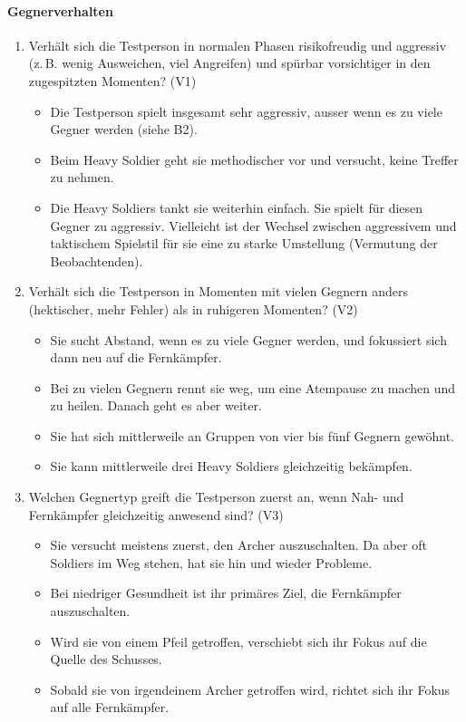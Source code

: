 \documentclass[../Main.tex]{subfiles}
\begin{document}
\paragraph{Gegnerverhalten}
\begin{enumerate}[label=\textbf{B\arabic*}, leftmargin=1.5cm, itemsep=0.8em]
    \item Verhält sich die Testperson in normalen Phasen risikofreudig und aggressiv (z.\,B. wenig Ausweichen, viel Angreifen) und spürbar vorsichtiger in den zugespitzten Momenten? \hfill (V1)
    \begin{itemize}[nosep]
        \item Die Testperson spielt insgesamt sehr aggressiv, ausser wenn es zu viele Gegner werden (siehe B2).
        \item Beim Heavy Soldier geht sie methodischer vor und versucht, keine Treffer zu nehmen.
        \item Die Heavy Soldiers tankt sie weiterhin einfach. Sie spielt für diesen Gegner zu aggressiv. Vielleicht ist der Wechsel zwischen aggressivem und taktischem Spielstil für sie eine zu starke Umstellung (Vermutung der Beobachtenden).
    \end{itemize}

    \item Verhält sich die Testperson in Momenten mit vielen Gegnern anders (hektischer, mehr Fehler) als in ruhigeren Momenten? \hfill (V2)
    \begin{itemize}[nosep]
        \item Sie sucht Abstand, wenn es zu viele Gegner werden, und fokussiert sich dann neu auf die Fernkämpfer.
        \item Bei zu vielen Gegnern rennt sie weg, um eine Atempause zu machen und zu heilen. Danach geht es aber weiter.
        \item Sie hat sich mittlerweile an Gruppen von vier bis fünf Gegnern gewöhnt.
        \item Sie kann mittlerweile drei Heavy Soldiers gleichzeitig bekämpfen.
    \end{itemize}

    \item Welchen Gegnertyp greift die Testperson zuerst an, wenn Nah- und Fernkämpfer gleichzeitig anwesend sind? \hfill (V3)
    \begin{itemize}[nosep]
        \item Sie versucht meistens zuerst, den Archer auszuschalten. Da aber oft Soldiers im Weg stehen, hat sie hin und wieder Probleme.
        \item Bei niedriger Gesundheit ist ihr primäres Ziel, die Fernkämpfer auszuschalten.
        \item Wird sie von einem Pfeil getroffen, verschiebt sich ihr Fokus auf die Quelle des Schusses.
        \item Sobald sie von irgendeinem Archer getroffen wird, richtet sich ihr Fokus auf alle Fernkämpfer.
    \end{itemize}


\end{enumerate}
\end{document}
